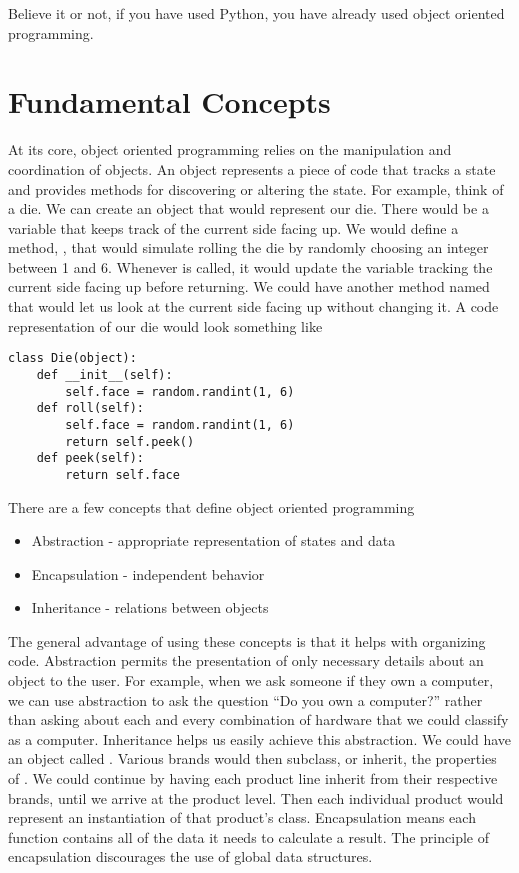\label{lab:OOP}

Believe it or not, if you have used Python, you have already used object oriented programming.

\section*{Fundamental Concepts}
At its core, object oriented programming relies on the manipulation and coordination of objects.
An object represents a piece of code that tracks a state and provides methods for discovering or altering the state.  For example, think of a die.  We can create an object that would represent our die.  There would be a variable that keeps track of the current side facing up.  We would define a method, , that would simulate rolling the die by randomly choosing an integer between 1 and 6.  Whenever  is called, it would update the variable tracking the current side facing up before returning.  We could have another method named  that would let us look at the current side facing up without changing it.  A code representation of our die would look something like
\begin{lstlisting}
class Die(object):
    def __init__(self):
        self.face = random.randint(1, 6)
    def roll(self):
        self.face = random.randint(1, 6)
        return self.peek()
    def peek(self):
        return self.face
\end{lstlisting}

There are a few concepts that define object oriented programming
\begin{itemize}
\item Abstraction - appropriate representation of states and data
\item Encapsulation - independent behavior
\item Inheritance - relations between objects
\end{itemize}
The general advantage of using these concepts is that it helps with organizing code.  Abstraction permits the presentation of only necessary details about an object to the user.  For example, when we ask someone if they own a computer, we can use abstraction to ask the question ``Do you own a computer?'' rather than asking about each and every combination of hardware that we could classify as a computer.  Inheritance helps us easily achieve this abstraction.  We could have an object called .  Various brands would then subclass, or inherit, the properties of .  We could continue by having each product line inherit from their respective brands, until we arrive at the product level.  Then each individual product would represent an instantiation of that product's class.
Encapsulation means each function contains all of the data it needs to calculate a result.  The principle of encapsulation discourages the use of global data structures.

